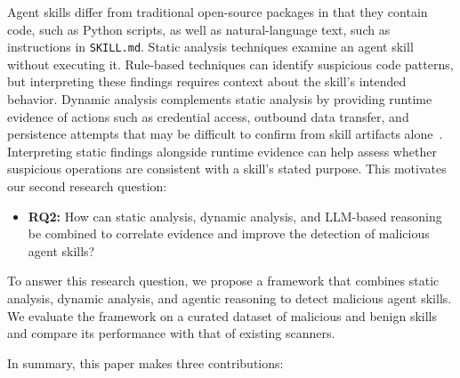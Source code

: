 Agent skills differ from traditional open-source packages in that they contain code, such as Python scripts, as well as natural-language text, such as instructions in \texttt{SKILL.md}. Static analysis techniques examine an agent skill without
executing it. Rule-based techniques can identify suspicious
code patterns, but interpreting these findings requires
context about the skill's intended behavior. Dynamic analysis complements static analysis by providing runtime evidence of actions such as
credential access, outbound data transfer, and persistence
attempts that may be difficult to confirm from skill artifacts
alone~\cite{cisco_skill_scanner, liuMaliciousSkillsWild2026}. Interpreting static findings alongside runtime evidence
can help assess whether suspicious operations are
consistent with a skill's stated purpose. This motivates
our second research question:




\begin{itemize}
\item \textbf{RQ2:} How can static analysis, dynamic analysis, and LLM-based reasoning be combined to correlate evidence and improve the detection of malicious agent skills?
\end{itemize}

To answer this research question, we propose a framework that combines static analysis, dynamic analysis, and agentic reasoning to detect malicious agent skills. We evaluate the framework on a curated dataset of malicious and benign skills and compare its performance with that of existing scanners.

In summary, this paper makes three contributions:

